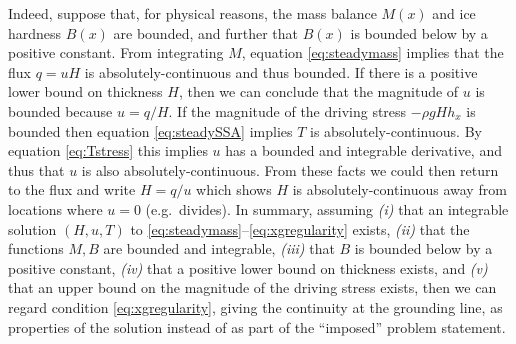 \documentclass[review,letterpaper]{igs}
\begin{document}
Indeed, suppose that, for physical reasons, the mass balance $M(x)$ and ice hardness $B(x)$ are bounded, and further that $B(x)$ is bounded below by a positive constant.  From integrating $M$, equation \eqref{eq:steadymass} implies that the flux $q=uH$ is absolutely-continuous and thus bounded.  If there is a positive lower bound on thickness $H$, then we can conclude that the magnitude of $u$ is bounded because $u=q/H$.  If the magnitude of the driving stress $-\rho g H h_x$ is bounded then equation \eqref{eq:steadySSA} implies $T$ is absolutely-continuous.  By equation \eqref{eq:Tstress} this implies $u$ has a bounded and integrable derivative, and thus that $u$ is also absolutely-continuous.  From these facts we could then return to the flux and write $H=q/u$ which shows $H$ is absolutely-continuous away from locations where $u=0$ (e.g.~divides).  In summary, assuming \emph{(i)} that an integrable solution $(H,u,T)$ to \eqref{eq:steadymass}--\eqref{eq:xgregularity} exists, \emph{(ii)} that the functions $M,B$ are bounded and integrable, \emph{(iii)} that $B$ is bounded below by a positive constant, \emph{(iv)} that a positive lower bound on thickness exists, and \emph{(v)} that an upper bound on the magnitude of the driving stress exists, then we can regard condition \eqref{eq:xgregularity}, giving the continuity at the grounding line, as properties of the solution instead of as part of the ``imposed'' problem statement.
\end{document}
